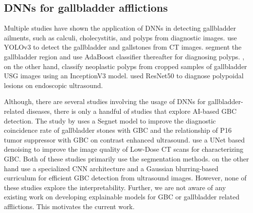 \documentclass[twocolumn,final]{elsarticle}
\begin{document}
\subsection{DNNs for gallbladder afflictions}
%
Multiple studies have shown the application of DNNs in detecting gallbladder ailments, such as calculi, cholecystitis, and polyps from diagnostic images. \cite{gbYolo} use YOLOv3 to detect the gallbladder and gallstones from CT images. \cite{gbPolyp} segment the gallbladder region and use AdaBoost classifier thereafter for diagnosing polyps. \cite{gbPolyp2}, on the other hand, classify neoplastic polyps from cropped samples of gallbladder USG images using an InceptionV3 model. \cite{jang2021diagnostic} used ResNet50 to diagnose polypoidal lesions on endoscopic ultrasound.
\par Although, there are several studies involving the usage of DNNs for gallbladder-related diseases, there is only a handful of studies that explore AI-based GBC detection. The study by \cite{xue2021segnet} uses a Segnet model to improve the diagnostic coincidence rate of gallbladder stones with GBC and the relationship of P16 tumor suppressor with GBC on contrast enhanced ultrasound. \cite{chang2022ct} use a UNet based denoising to improve the image quality of Low-Dose CT scans for characterizing GBC. Both of these studies primarily use the segmentation methods. \cite{basu2022surpassing} on the other hand use a specialized CNN architecture and a Gaussian blurring-based curriculum for efficient GBC detection from ultrasound images. However, none of these studies explore the interpretability.  
Further, we are not aware of any existing work on developing explainable models for GBC or gallbladder related afflictions. This motivates the current work.
\end{document}
